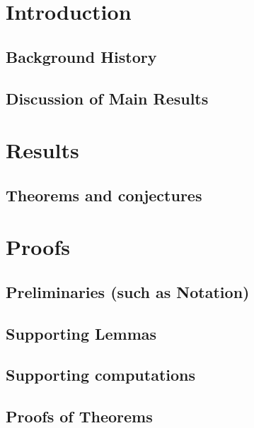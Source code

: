\begin{abstract}
  \noindent
\end{abstract}

\maketitle
\section{ Introduction}
\subsection{ Background History}
\subsection{ Discussion of Main Results}
\section{ Results}
\subsection{ Theorems and conjectures}
\section{ Proofs}
\subsection{ Preliminaries (such as Notation)}
\subsection{Supporting Lemmas}
\subsection{Supporting computations}
\subsection{Proofs of Theorems}
